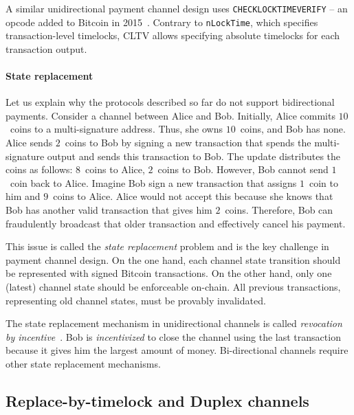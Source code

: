 A similar unidirectional payment channel design uses \texttt{CHECKLOCKTIMEVERIFY} -- an opcode added to Bitcoin in 2015~\cite{Todd2014}.
Contrary to \texttt{nLockTime}, which specifies transaction-level timelocks, CLTV allows specifying absolute timelocks for each transaction output.

\paragraph{State replacement}

Let us explain why the protocols described so far do not support bidirectional payments.
Consider a channel between Alice and Bob.
Initially, Alice commits $10$~coins to a multi-signature address.
Thus, she owns $10$~coins, and Bob has none.
Alice sends $2$~coins to Bob by signing a new transaction that spends the multi-signature output and sends this transaction to Bob.
The update distributes the coins as follows: $8$~coins to Alice, $2$~coins to Bob.
However, Bob cannot send $1$~coin back to Alice.
Imagine Bob sign a new transaction that assigns $1$~coin to him and $9$~coins to Alice.
Alice would not accept this because she knows that Bob has another valid transaction that gives him $2$~coins.
Therefore, Bob can fraudulently broadcast that older transaction and effectively cancel his payment.

This issue is called the \textit{state replacement} problem and is the key challenge in payment channel design.
On the one hand, each channel state transition should be represented with signed Bitcoin transactions.
On the other hand, only one (latest) channel state should be enforceable on-chain.
All previous transactions, representing old channel states, must be provably invalidated.

The state replacement mechanism in unidirectional channels is called \textit{revocation by incentive}~\cite{Gudgeon2019}.
Bob is \textit{incentivized} to close the channel using the last transaction because it gives him the largest amount of money.
Bi-directional channels require other state replacement mechanisms.


\subsection{Replace-by-timelock and Duplex channels}

